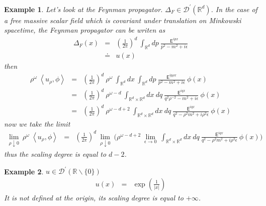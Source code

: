 \documentclass[10pt]{book}
\newcommand{\abs}[1]{\left|#1\right|}
\newcommand{\sm}[1]{\left\langle#1\right\rangle}
\let\int\int
\newcommand{\Dcal}{\mathcal{D}}
\newcommand{\Rbb}{\mathbb{R}}
\newcommand{\Esf}{\mathsf{E}}
\theoremstyle{break}
\newtheorem{example}{Example}
\begin{document}
\begin{example} 
 Let's look at the Feynman propagator. $\Delta_F \in \Dcal^\prime(\Rbb^d)$. In the case of a free massive scalar field which is covariant under translation on Minkowski spacetime, the Feynman propagator can be writen as
 \begin{eqnarray*}
  \Delta_F(x) &=& \left(\frac{1}{2\pi}\right)^d \ \int_{\Rbb^d} dp \ \frac{\Esf^{ipx}}{p^2 - m^2 + i \epsilon} \\
  &\doteq& u(x) 
 \end{eqnarray*}
 then
 \begin{eqnarray*}
  \rho^\omega \ \sm{u_\rho,\phi} &=& \left(\frac{1}{2\pi}\right)^d \ \rho^\omega \ \int_{\Rbb^d} dx \ \int_{\Rbb^d} dp \ \frac{\Esf^{ip\rho x}}{p^2 - m^2 + i \epsilon}\ \phi(x) \\
  &=& \left(\frac{1}{2\pi}\right)^d \ \rho^{\omega-d} \ \int_{\Rbb^d \times \Rbb^d} dx \ dq \ \frac{\Esf^{iqx}}{q^2\rho^{-2} - m^2 + i \epsilon}\ \phi(x) \\
  &=& \left(\frac{1}{2\pi}\right)^d \ \rho^{\omega-d+2} \ \int_{\Rbb^d \times \Rbb^d} dx \ dq \ \frac{\Esf^{iqx}}{q^2 - \rho^2m^2 + i \rho^2\epsilon}\ \phi(x) 
 \end{eqnarray*}
 now we take the limit
 \begin{eqnarray*}
  \lim_{\rho \downarrow 0} \ \rho^\omega \ \sm{u_\rho,\phi} &=& \left(\frac{1}{2\pi}\right)^d \ \lim_{\rho \downarrow 0} \ \bigg(\rho^{\omega-d+2} \ \lim_{\epsilon \to 0} \ \int_{\Rbb^d \times \Rbb^d} dx \ dq \ \frac{\Esf^{iqx}}{q^2 - \rho^2m^2 + i \rho^2\epsilon}\ \phi(x)  \bigg) 
 \end{eqnarray*}
 thus the scaling degree is equal to $d-2$. 
\end{example}

\begin{example} 
 $u \in \Dcal^\prime(\Rbb \backslash \{0\})$
 \begin{eqnarray*}
  u(x) &=& \exp\left(\frac{1}{\abs{x}}\right)
 \end{eqnarray*}
 It is not defined at the origin, its scaling degree is equal to $+\infty$. 
\end{example}
\end{document}
